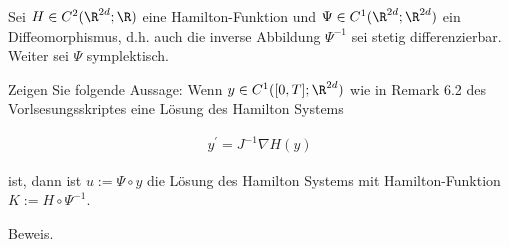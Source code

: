 \begin{exercise}
  Sei $H \in C^2(\R^{2d};\R)$ eine Hamilton-Funktion und
  $\Psi \in C^1(\R^{2d};\R^{2d})$ ein Diffeomorphismus,
  d.h. auch die inverse Abbildung $\Psi^{-1}$ sei stetig
  differenzierbar. Weiter sei $\Psi$ symplektisch.

  Zeigen Sie folgende Aussage: Wenn $y \in C^1([0,T];\R^{2d})$
  wie in Remark 6.2 des Vorlsesungsskriptes eine Lösung des
  Hamilton Systems

  \begin{align}
    y^\prime = J^{-1}\nabla H(y)
  \end{align}

  ist, dann ist $u := \Psi \circ y$ die Lösung des Hamilton
  Systems mit Hamilton-Funktion $K := H \circ \Psi^{-1}$.
\end{exercise}

\begin{solution}
  Beweis.
\end{solution}
